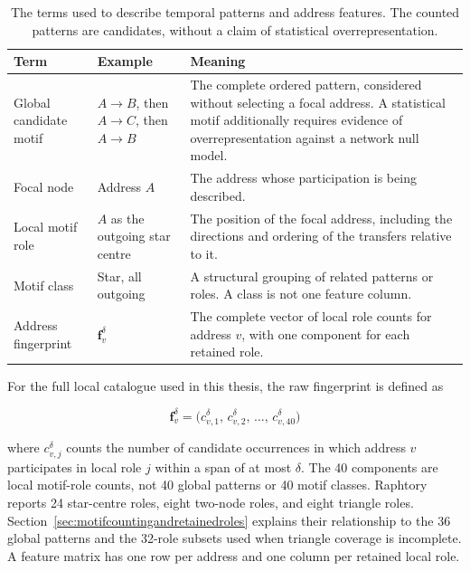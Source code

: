 \documentclass{thesisclass}
\begin{document}
\begin{table}[htbp]
\centering
\small
\caption{The terms used to describe temporal patterns and address features.
The counted patterns are candidates, without a claim of statistical
overrepresentation.}
\label{tab:motif_terminology}
\begin{tabular}{@{}p{2.9cm} p{3.6cm} p{6.1cm}@{}}
\toprule
\textbf{Term} & \textbf{Example} & \textbf{Meaning} \\
\midrule
Global candidate motif &
$A \to B$, then $A \to C$, then $A \to B$ &
The complete ordered pattern, considered without selecting a focal address.
A statistical motif additionally requires evidence of overrepresentation
against a network null model. \\[5pt]
Focal node &
Address $A$ &
The address whose participation is being described. \\[5pt]
Local motif role &
$A$ as the outgoing star centre &
The position of the focal address, including the directions and ordering of
the transfers relative to it. \\[5pt]
Motif class &
Star, all outgoing &
A structural grouping of related patterns or roles. A class is not one
feature column. \\[5pt]
Address fingerprint &
$\mathbf{f}_v^\delta$ &
The complete vector of local role counts for address $v$, with one component
for each retained role. \\
\bottomrule
\end{tabular}
\end{table}

For the full local catalogue used in this thesis, the raw fingerprint is
defined as

\begin{equation}
    \mathbf{f}_v^{\delta}
      = \bigl(c_{v,1}^{\delta},\,c_{v,2}^{\delta},\,\ldots,\,c_{v,40}^{\delta}\bigr)
    \label{eq:motif_fingerprint}
\end{equation}

where $c_{v,j}^{\delta}$ counts the number of candidate occurrences in which
address $v$ participates in local role $j$ within a span of at most $\delta$.
The 40 components are local motif-role counts, not 40 global patterns or 40
motif classes. Raphtory reports 24 star-centre roles, eight two-node roles, and
eight triangle roles. Section~\ref{sec:motifcountingandretainedroles} explains
their relationship to the 36 global patterns and the 32-role subsets used when
triangle coverage is incomplete. A feature matrix has one row per address and
one column per retained local role.
\end{document}
